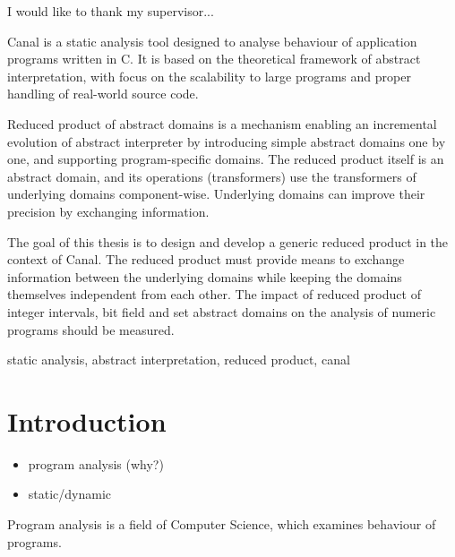 \documentclass[12pt,oneside,draft]{fithesis2}
\begin{document}
\FrontMatter
\ThesisTitlePage

\begin{ThesisDeclaration}
\DeclarationText
\AdvisorName
\end{ThesisDeclaration}

\begin{ThesisThanks}
I would like to thank my supervisor...
\end{ThesisThanks}

\begin{ThesisAbstract}
Canal is a static analysis tool designed to analyse behaviour of application programs written in C. It is based on the theoretical framework of abstract interpretation, with focus on the scalability to large programs and proper handling of real-world source code.

Reduced product of abstract domains is a mechanism enabling an incremental evolution of abstract interpreter by introducing simple abstract domains one by one, and supporting program-specific domains. The reduced product itself is an abstract domain, and its operations (transformers) use the transformers of underlying domains component-wise. Underlying domains can improve their precision by exchanging information.

The goal of this thesis is to design and develop a generic reduced product in the context of Canal. The reduced product must provide means to exchange information between the underlying domains while keeping the domains themselves independent from each other. The impact of reduced product of integer intervals, bit field and set abstract domains on the analysis of numeric programs should be measured.
\end{ThesisAbstract}

\begin{ThesisKeyWords}
static analysis, abstract interpretation, reduced product, canal
\end{ThesisKeyWords}

\tableofcontents

\MainMatter
\chapter{Introduction}
\begin{itemize}
  \item program analysis (why?)
  \item static/dynamic
\end{itemize}

Program analysis is a field of Computer Science, which examines behaviour of programs.
\end{document}
